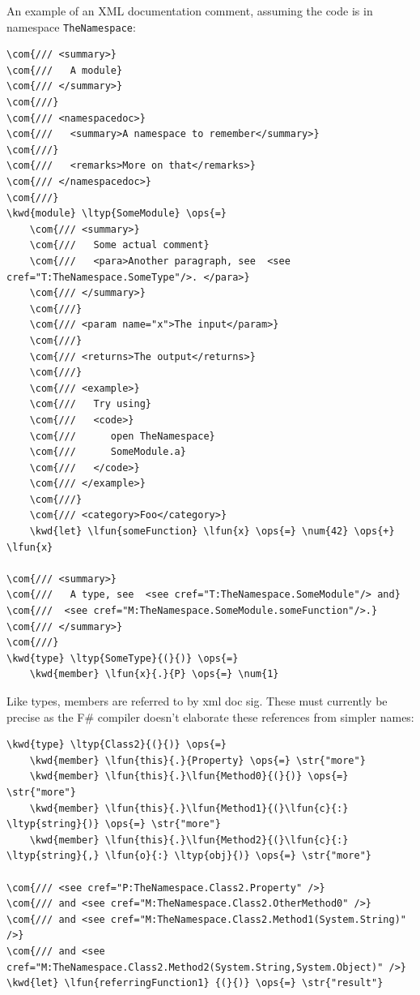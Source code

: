 \documentclass{article}
\newcommand{\com}[1]{\textcolor{officegreen}{#1}}
\newcommand{\kwd}[1]{\textcolor{navy}{#1}}
\newcommand{\num}[1]{\textcolor{officegreen}{#1}}
\newcommand{\ops}[1]{\textcolor{purple}{#1}}
\newcommand{\str}[1]{\textcolor{olive}{#1}}
\begin{document}
An example of an XML documentation comment, assuming the code is in namespace \texttt{TheNamespace}:
\begin{Verbatim}[commandchars=\\\{\}]
\com{/// <summary>}
\com{///   A module}
\com{/// </summary>}
\com{///}
\com{/// <namespacedoc>}
\com{///   <summary>A namespace to remember</summary>}
\com{///}
\com{///   <remarks>More on that</remarks>}
\com{/// </namespacedoc>}
\com{///}
\kwd{module} \ltyp{SomeModule} \ops{=}
    \com{/// <summary>}
    \com{///   Some actual comment}
    \com{///   <para>Another paragraph, see  <see cref="T:TheNamespace.SomeType"/>. </para>}
    \com{/// </summary>}
    \com{///}
    \com{/// <param name="x">The input</param>}
    \com{///}
    \com{/// <returns>The output</returns>}
    \com{///}
    \com{/// <example>}
    \com{///   Try using}
    \com{///   <code>}
    \com{///      open TheNamespace}
    \com{///      SomeModule.a}
    \com{///   </code>}
    \com{/// </example>}
    \com{///}
    \com{/// <category>Foo</category>}
    \kwd{let} \lfun{someFunction} \lfun{x} \ops{=} \num{42} \ops{+} \lfun{x}

\com{/// <summary>}
\com{///   A type, see  <see cref="T:TheNamespace.SomeModule"/> and}
\com{///  <see cref="M:TheNamespace.SomeModule.someFunction"/>.}
\com{/// </summary>}
\com{///}
\kwd{type} \ltyp{SomeType}{(}{)} \ops{=}
    \kwd{member} \lfun{x}{.}{P} \ops{=} \num{1}
\end{Verbatim}



Like types, members are referred to by xml doc sig.  These must currently be precise as the F\#
compiler doesn't elaborate these references from simpler names:
\begin{Verbatim}[commandchars=\\\{\}]
\kwd{type} \ltyp{Class2}{(}{)} \ops{=}
    \kwd{member} \lfun{this}{.}{Property} \ops{=} \str{"more"}
    \kwd{member} \lfun{this}{.}\lfun{Method0}{(}{)} \ops{=} \str{"more"}
    \kwd{member} \lfun{this}{.}\lfun{Method1}{(}\lfun{c}{:} \ltyp{string}{)} \ops{=} \str{"more"}
    \kwd{member} \lfun{this}{.}\lfun{Method2}{(}\lfun{c}{:} \ltyp{string}{,} \lfun{o}{:} \ltyp{obj}{)} \ops{=} \str{"more"}

\com{/// <see cref="P:TheNamespace.Class2.Property" />}
\com{/// and <see cref="M:TheNamespace.Class2.OtherMethod0" />}
\com{/// and <see cref="M:TheNamespace.Class2.Method1(System.String)" />}
\com{/// and <see cref="M:TheNamespace.Class2.Method2(System.String,System.Object)" />}
\kwd{let} \lfun{referringFunction1} {(}{)} \ops{=} \str{"result"}
\end{Verbatim}
\end{document}
